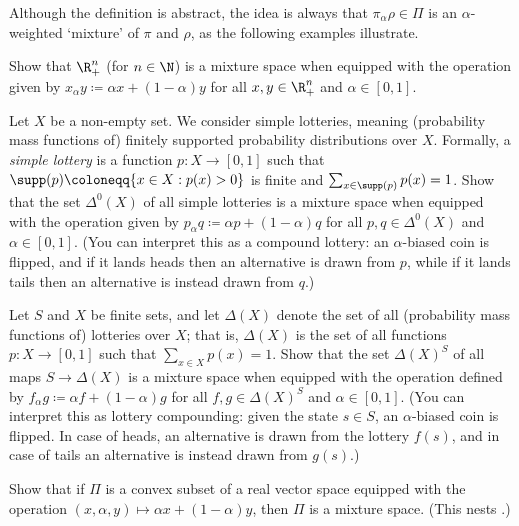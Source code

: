 Although the definition is abstract, the idea is always that $\pi_\alpha \rho \in \Pi$ is an $\alpha$-weighted `mixture' of $\pi$ and $\rho$, as the following examples illustrate.

\begin{exercise}
	\label{exercise:mix_Rn}
	Show that $\R_+^n$ (for $n \in \N$) is a mixture space when equipped with the operation given by $x_\alpha y \coloneqq \alpha x + (1-\alpha) y$ for all $x,y \in \R_+^n$ and $\alpha \in [0,1]$.
\end{exercise}

\begin{exercise}
	\label{exercise:mix_lottsimple}
	Let $X$ be a non-empty set. We consider simple lotteries, meaning (probability mass functions of) finitely supported probability distributions over $X$. Formally, a \emph{simple lottery} is a function $p : X \to [0,1]$ such that $\supp(p) \coloneqq \{ x \in X : p(x) > 0 \}$ is finite and $\sum_{x \in \supp(p)} p(x) = 1$. Show that the set $\Delta^0(X)$ of all simple lotteries is a mixture space when equipped with the operation given by $p_\alpha q \coloneqq \alpha p + (1-\alpha) q$ for all $p,q \in \Delta^0(X)$ and $\alpha \in [0,1]$. (You can interpret this as a compound lottery: an $\alpha$-biased coin is flipped, and if it lands heads then an alternative is drawn from $p$, while if it lands tails then an alternative is instead drawn from $q$.)
\end{exercise}

\begin{exercise}
	\label{exercise:mix_acts}
	Let $S$ and $X$ be finite sets, and let $\Delta(X)$ denote the set of all (probability mass functions of) lotteries over $X$; that is, $\Delta(X)$ is the set of all functions $p : X \to [0,1]$ such that $\sum_{x \in X} p(x)=1$. Show that the set $\Delta(X)^S$ of all maps $S \to \Delta(X)$ is a mixture space when equipped with the operation defined by $f_\alpha g \coloneqq \alpha f + (1-\alpha) g$ for all $f,g \in \Delta(X)^S$ and $\alpha \in [0,1]$. (You can interpret this as lottery compounding: given the state $s \in S$, an $\alpha$-biased coin is flipped. In case of heads, an alternative is drawn from the lottery $f(s)$, and in case of tails an alternative is instead drawn from $g(s)$.)
\end{exercise}

\begin{exercise}
	\label{exercise:mix_convex}
	Show that if $\Pi$ is a convex subset of a real vector space equipped with the operation $(x,\alpha,y) \mapsto \alpha x + (1-\alpha) y$, then $\Pi$ is a mixture space. (This nests .)
\end{exercise}

